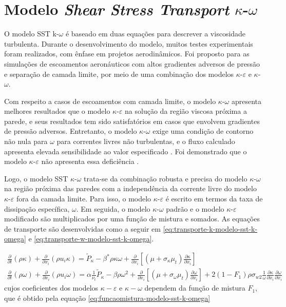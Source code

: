 \section{Modelo \textit{Shear Stress Transport} \texorpdfstring{$\kappa$-$\omega$}{k-w}}

O modelo SST k-$\omega$ \cite{Menter1994TwoequationET,Menter2003,Menter2009} é baseado em duas equações para descrever a viscosidade turbulenta. Durante o desenvolvimento do modelo, muitos testes experimentais foram realizados, com ênfase em projetos aerodinâmicos. Foi proposto para as simulações de escoamentos aeronáuticos com altos gradientes adversos de pressão e separação de camada limite, por meio de uma combinação dos modelos $\kappa$-$\varepsilon$ e $\kappa$-$\omega$.

Com respeito a casos de escoamentos com camada limite, o modelo $\kappa$-$\omega$ apresenta melhores resultados que o modelo $\kappa$-$\varepsilon$ na solução da região viscosa próxima a parede, e seus resultados tem sido satisfatórios em casos que envolvem gradientes de pressão adversos. Entretanto, o modelo $\kappa$-$\omega$ exige uma condição de contorno não nula para $\omega$ para correntes livres não turbulentas, e o fluxo calculado apresenta elevada sensibilidade ao valor especificado \cite{Menter1994TwoequationET}. Foi demonstrado que o modelo $\kappa$-$\varepsilon$ não apresenta essa deficiência \cite{Cazalbou1994}.

Logo, o modelo SST $\kappa$-$\omega$ trata-se da combinação robusta e precisa do modelo $\kappa$-$\omega$ na região próxima das paredes com a independência da corrente livre do modelo $\kappa$-$\varepsilon$ fora da camada limite. Para isso, o modelo $\kappa$-$\varepsilon$ é escrito em termos da taxa de dissipação específica, $\omega$. Em seguida, o modelo $\kappa$-$\omega$ padrão e o modelo $\kappa$-$\varepsilon$ modificado são multiplicados por uma função de mistura e somados. As equações de transporte são desenvolvidas como a seguir em \ref{eq:transporte-k-modelo-sst-k-omega} e \ref{eq:transporte-w-modelo-sst-k-omega}.

\begin{gather}
    \frac{\partial}{\partial t}(\rho\kappa) +\frac{\partial}{\partial x_i}(\rho u_i \kappa) = \tilde{P}_\kappa - \beta^{*}\rho\kappa\omega + \frac{\partial}{\partial x_i}\left[(\mu + \sigma_{\kappa}\mu_t)\frac{\partial \kappa}{\partial x_i}\right]
    \label{eq:transporte-k-modelo-sst-k-omega}
    \\
   	\frac{\partial}{\partial t}(\rho\omega) +\frac{\partial}{\partial x_i}(\rho u_i \omega)  = \alpha\frac{1}{\nu_t}\tilde{P}_\kappa - \beta\rho\omega^{2} + \frac{\partial}{\partial x_i}\left[(\mu + \sigma_{\omega}\mu_t)\frac{\partial \omega}{\partial x_i}\right] + 2(1 - F_1)\rho\sigma_{w2}\frac{1}{\omega}\frac{\partial\kappa}{\partial x_i}\frac{\partial \omega}{\partial x_i}
    \label{eq:transporte-w-modelo-sst-k-omega}
\end{gather}
%
cujos coeficientes dos modelos $\kappa-\varepsilon$ e $\kappa-\omega$ dependem da função de mistura $F_1$, que é obtido pela equação \ref{eq:funcaomistura-modelo-sst-k-omega}

